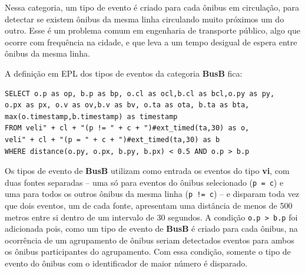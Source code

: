 \begin{itemize}
Nessa categoria, um tipo de evento é criado para cada ônibus em circulação, para detectar se existem ônibus da mesma linha circulando muito próximos um do outro. 
Esse é um problema comum em engenharia de transporte público, algo que ocorre com frequência na cidade, e que leva a um tempo desigual de espera entre ônibus da mesma linha. 

A definição em EPL dos tipos de eventos da categoria \textbf{BusB} fica: 
  
\begin{verbatim}
SELECT o.p as op, b.p as bp, o.cl as ocl,b.cl as bcl,o.py as py,
o.px as px, o.v as ov,b.v as bv, o.ta as ota, b.ta as bta,
max(o.timestamp,b.timestamp) as timestamp 
FROM veli" + cl + "(p != " + c + ")#ext_timed(ta,30) as o,
veli" + cl + "(p = " + c + ")#ext_timed(ta,30) as b 
WHERE distance(o.py, o.px, b.py, b.px) < 0.5 AND o.p > b.p
\end{verbatim}
Os tipos de evento de \textbf{BusB} utilizam como entrada os eventos do tipo \textbf{vi}, com duas fontes separadas -- uma só para eventos do ônibus selecionado (\texttt{p = c}) e uma para todos os outros ônibus da mesma linha (\texttt{p != c}) -- e disparam toda vez que dois eventos, um de cada fonte, apresentam uma distância de menos de 500 metros entre si dentro de um intervalo de 30 segundos. A condição \texttt{o.p > b.p} foi adicionada pois, como um tipo de evento de \textbf{BusB} é criado para cada ônibus, na ocorrência de um agrupamento de ônibus seriam detectados eventos para ambos os ônibus participantes do agrupamento. Com essa condição, somente o tipo de evento do ônibus com o identificador de maior número é disparado.

\end{itemize}





